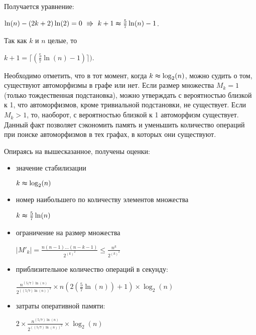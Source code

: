 Получается уравнение:

$\ln(n) - (2k+2)\ln(2) = 0\ \Rrightarrow \  k+1 \thickapprox \frac{5}{7}\ln(n) - 1$. 

Так как $k$ и $n$ целые, то 

$k + 1 = \lceil(\frac{5}{7}\ln(n) - 1)\rceil)$.

Необходимо отметить, что в тот момент, когда $k \thickapprox \log _2(n)$, можно судить о том, существуют автоморфизмы в графе или нет. Если размер множества $M_k = 1$ (только тождественная подстановка), можно утверждать с вероятностью близкой к 1, что автоморфизмов, кроме тривиальной подстановки, не существует. Если $M_k > 1$, то, наоборот, с вероятностью близкой к 1 автоморфизм существует. Данный факт позволяет сэкономить память и уменьшить количество операций при поиске автоморфизмов в тех графах, в которых они существуют.

Опираясь на вышесказанное, получены оценки:
\begin{itemize}
\item значение стабилизации 

$k \thickapprox \log _2(n)$
\item номер наибольшего по количеству элементов множества 

$k \thickapprox \frac{5}{7}\ln(n)$
\item ограничение на размер множества 

$|M'_k| = \frac{n(n-1)\ldots(n-k-1)}{2^{(k)^2}} \le \frac{n^{k}}{2^{(k)^2}}$
\item приблизительное количество операций в секунду:

$\frac{n^{(5/7) \ln(n)}}{2^{((5/7)\ln(n))^2}}\times n(2(\frac{5}{7}\ln(n)) + 1)\times \log_2(n)$

\item затраты оперативной памяти: 

$2 \times \frac{n^{(5/7) \ln(n)}}{2^{((5/7)\ln(n))^2}} \times \log_2(n)$
\end{itemize}
